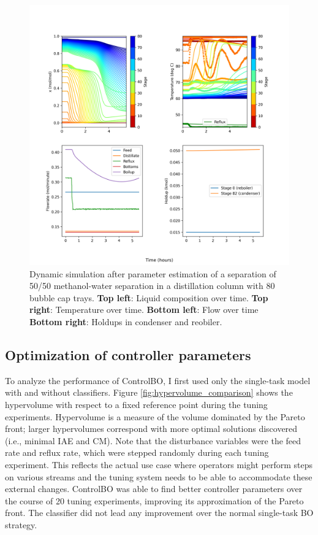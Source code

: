 \begin{figure}
    \centering
    \includegraphics[width=\textwidth]{gfx/Chapter06/2021_11_17_closed_loop_dynamic.png}
    \caption{Dynamic simulation after parameter estimation of a separation of 50/50 methanol-water separation in a distillation column with 80 bubble cap trays. \textbf{Top left}: Liquid composition over time. \textbf{Top right}: Temperature over time. \textbf{Bottom left}: Flow over time \textbf{Bottom right}: Holdups in condenser and reobiler.}
    \label{fig:dynamic_nominal}
\end{figure}


\subsection{Optimization of controller parameters}

To analyze the performance of ControlBO, I first used only the single-task model with and without classifiers. Figure \ref{fig:hypervolume_comparison} shows the hypervolume with respect to a fixed reference point during the tuning experiments. Hypervolume is a measure of the volume dominated by the Pareto front; larger hypervolumes correspond with more optimal solutions discovered (i.e., minimal IAE and CM). Note that the disturbance variables were the feed rate and reflux rate, which were stepped randomly during each tuning experiment. This reflects the actual use case where operators might perform steps on various streams and the tuning system needs to be able to accommodate these external changes. ControlBO was able to find better controller parameters over the course of 20 tuning experiments, improving its approximation of the Pareto front. The classifier did not lead any improvement over the normal single-task BO strategy. 

